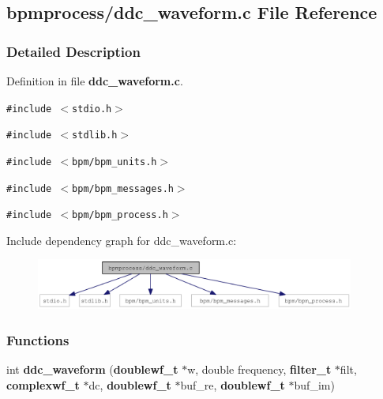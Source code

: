 \subsection{bpmprocess/ddc\_\-waveform.c File Reference}
\label{ddc__waveform_8c}


\subsubsection{Detailed Description}


Definition in file {\bf ddc\_\-waveform.c}.

{\tt \#include $<$stdio.h$>$}\par
{\tt \#include $<$stdlib.h$>$}\par
{\tt \#include $<$bpm/bpm\_\-units.h$>$}\par
{\tt \#include $<$bpm/bpm\_\-messages.h$>$}\par
{\tt \#include $<$bpm/bpm\_\-process.h$>$}\par


Include dependency graph for ddc\_\-waveform.c:\nopagebreak
\begin{figure}[H]
\begin{center}
\leavevmode
\includegraphics[width=297pt]{ddc__waveform_8c__incl}
\end{center}
\end{figure}
\subsubsection*{Functions}
\begin{CompactItemize}
\item 
int {\bf ddc\_\-waveform} ({\bf doublewf\_\-t} $\ast$w, double frequency, {\bf filter\_\-t} $\ast$filt, {\bf complexwf\_\-t} $\ast$dc, {\bf doublewf\_\-t} $\ast$buf\_\-re, {\bf doublewf\_\-t} $\ast$buf\_\-im)
\end{CompactItemize}
